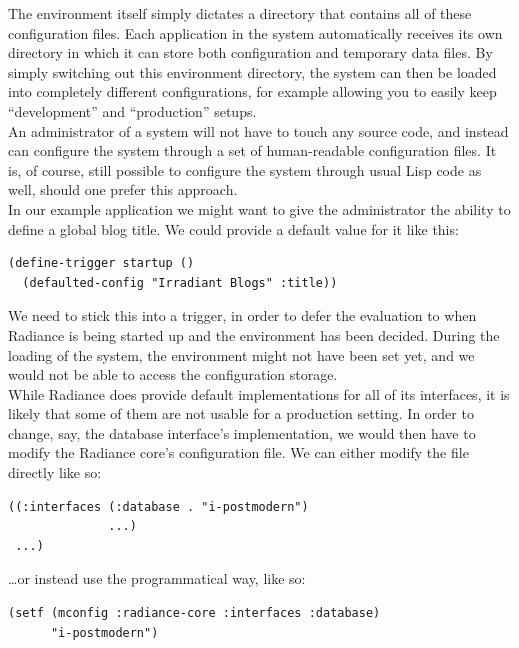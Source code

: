 \documentclass{sig-alternate}
\begin{document}
The environment itself simply dictates a directory that contains all of these configuration files. Each application in the system automatically receives its own directory in which it can store both configuration and temporary data files. By simply switching out this environment directory, the system can then be loaded into completely different configurations, for example allowing you to easily keep ``development'' and ``production'' setups. \\

An administrator of a system will not have to touch any source code, and instead can configure the system through a set of human-readable configuration files. It is, of course, still possible to configure the system through usual Lisp code as well, should one prefer this approach. \\

In our example application we might want to give the administrator the ability to define a global blog title. We could provide a default value for it like this:

\begin{verbatim}
(define-trigger startup ()
  (defaulted-config "Irradiant Blogs" :title))
\end{verbatim}

We need to stick this into a trigger, in order to defer the evaluation to when Radiance is being started up and the environment has been decided. During the loading of the system, the environment might not have been set yet, and we would not be able to access the configuration storage. \\

While Radiance does provide default implementations for all of its interfaces, it is likely that some of them are not usable for a production setting. In order to change, say, the database interface's implementation, we would then have to modify the Radiance core's configuration file. We can either modify the file directly like so:

\begin{verbatim}
((:interfaces (:database . "i-postmodern")
              ...)
 ...)
\end{verbatim}

\dots or instead use the programmatical way, like so:

\begin{verbatim}
(setf (mconfig :radiance-core :interfaces :database)
      "i-postmodern")
\end{verbatim}
\end{document}
